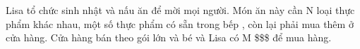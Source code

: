 Lisa tổ chức sinh nhật và nấu ăn để mời mọi người. Món ăn này cần N loại thực phẩm khác nhau, một số thực phẩm có sẵn trong bếp , còn lại phải mua thêm ở cửa hàng. Cửa hàng bán theo gói lớn và bé và Lisa có M \$\$\$ để mua hàng.

\
